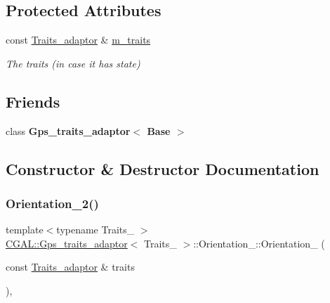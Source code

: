 \subsection*{Protected Attributes}
\begin{DoxyCompactItemize}
\item 
\mbox{\label{class_c_g_a_l_1_1_gps__traits__adaptor_1_1_orientation__2_a877c6376d6a59955c38d2c0e7c5c4329}} 
const \mbox{\hyperlink{class_c_g_a_l_1_1_gps__traits__adaptor}{Traits\+\_\+adaptor}} \& \mbox{\hyperlink{class_c_g_a_l_1_1_gps__traits__adaptor_1_1_orientation__2_a877c6376d6a59955c38d2c0e7c5c4329}{m\+\_\+traits}}
\begin{DoxyCompactList}\small\item\em The traits (in case it has state) \end{DoxyCompactList}\end{DoxyCompactItemize}
\subsection*{Friends}
\begin{DoxyCompactItemize}
\item 
\mbox{\label{class_c_g_a_l_1_1_gps__traits__adaptor_1_1_orientation__2_a4d2b49536a2c62dc9d864d67dc9133b9}} 
class {\bfseries Gps\+\_\+traits\+\_\+adaptor$<$ Base $>$}
\end{DoxyCompactItemize}


\subsection{Constructor \& Destructor Documentation}
\mbox{\label{class_c_g_a_l_1_1_gps__traits__adaptor_1_1_orientation__2_a53e8983c4f59cbc3db726a1274c0b176}} 
\subsubsection{\texorpdfstring{Orientation\_2()}{Orientation\_2()}}
{\footnotesize\ttfamily template$<$typename Traits\+\_\+ $>$ \\
\mbox{\hyperlink{class_c_g_a_l_1_1_gps__traits__adaptor}{C\+G\+A\+L\+::\+Gps\+\_\+traits\+\_\+adaptor}}$<$ Traits\+\_\+ $>$\+::Orientation\+\_\+::\+Orientation\+\_ (\begin{DoxyParamCaption}\item[{const \mbox{\hyperlink{class_c_g_a_l_1_1_gps__traits__adaptor}{Traits\+\_\+adaptor}} \&}]{traits }\end{DoxyParamCaption})\hspace{0.3cm}{\ttfamily [inline]}, {\ttfamily [protected]}}



